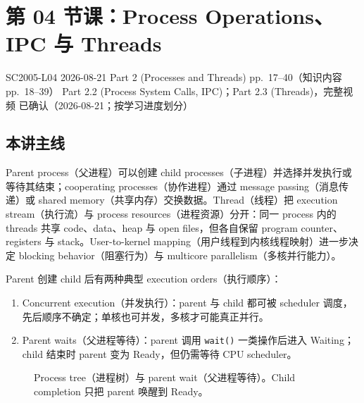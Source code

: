 
\section{第 04 节课：Process Operations、IPC 与 Threads}
\label{lecture:SC2005-L04}

\lecturemeta
  {SC2005-L04}
  {2026-08-21}
  {Part 2 (Processes and Threads)}
  {pp.~17--40（知识内容 pp.~18--39）}
  {Part 2.2 (Process System Calls, IPC)；Part 2.3 (Threads)，完整视频}
  {已确认（2026-08-21；按学习进度划分）}

\subsection{本讲主线}

Parent process（父进程）可以创建 child processes（子进程）并选择并发执行或等待其结束；cooperating processes（协作进程）通过 message passing（消息传递）或 shared memory（共享内存）交换数据。Thread（线程）把 execution stream（执行流）与 process resources（进程资源）分开：同一 process 内的 threads 共享 code、data、heap 与 open files，但各自保留 program counter、registers 与 stack。User-to-kernel mapping（用户线程到内核线程映射）进一步决定 blocking behavior（阻塞行为）与 multicore parallelism（多核并行能力）。



Parent 创建 child 后有两种典型 execution orders（执行顺序）：
\begin{enumerate}
  \item Concurrent execution（并发执行）：parent 与 child 都可被 scheduler 调度，先后顺序不确定；单核也可并发，多核才可能真正并行。
  \item Parent waits（父进程等待）：parent 调用 \texttt{wait()} 一类操作后进入 Waiting；child 结束时 parent 变为 Ready，但仍需等待 CPU scheduler。
\end{enumerate}

\begin{figure}[htbp]
  \centering
  \resizebox{0.94\textwidth}{!}{}
  \caption{Process tree（进程树）与 parent wait（父进程等待）。Child completion 只把 parent 唤醒到 Ready。}
  \label{fig:sc2005-l04-process-tree}
\end{figure}

